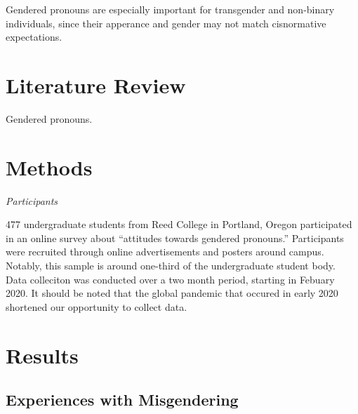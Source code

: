 \documentclass[12pt,twoside]{reedthesis}
\begin{document}
Gendered pronouns are especially important for transgender and
non-binary individuals, since their apperance and gender may not match
cisnormative expectations.

\chapter{Literature Review}\label{litreview}

Gendered pronouns.

\chapter{Methods}\label{methods}

\emph{Participants}

477 undergraduate students from Reed College in Portland, Oregon
participated in an online survey about ``attitudes towards gendered
pronouns.'' Participants were recruited through online advertisements
and posters around campus. Notably, this sample is around one-third of
the undergraduate student body. Data colleciton was conducted over a two
month period, starting in Febuary 2020. It should be noted that the
global pandemic that occured in early 2020 shortened our opportunity to
collect data.

\chapter{Results}\label{results}

\section{Experiences with
Misgendering}\label{experiences-with-misgendering}
\end{document}
